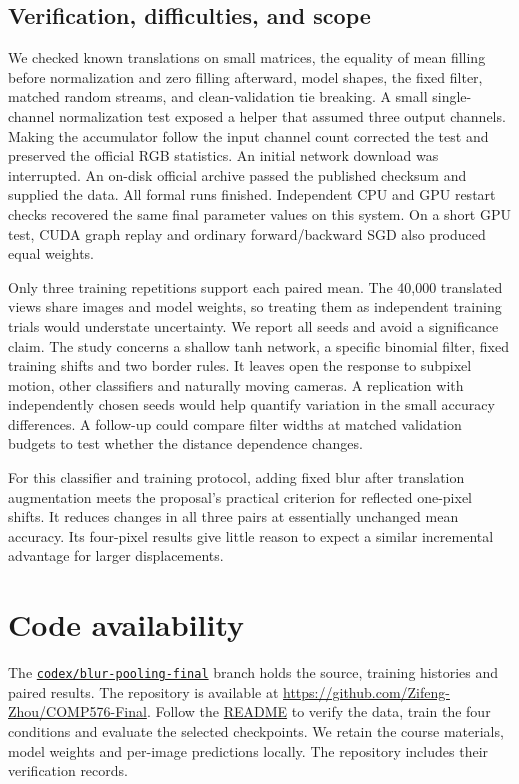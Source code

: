 \documentclass[conference]{IEEEtran}
\begin{document}
\subsection{Verification, difficulties, and scope}
We checked known translations on small matrices, the equality of mean filling before normalization and zero filling afterward, model shapes, the fixed filter, matched random streams, and clean-validation tie breaking. A small single-channel normalization test exposed a helper that assumed three output channels. Making the accumulator follow the input channel count corrected the test and preserved the official RGB statistics. An initial network download was interrupted. An on-disk official archive passed the published checksum and supplied the data. All formal runs finished. Independent CPU and GPU restart checks recovered the same final parameter values on this system. On a short GPU test, CUDA graph replay and ordinary forward/backward SGD also produced equal weights.

Only three training repetitions support each paired mean. The 40,000 translated views share images and model weights, so treating them as independent training trials would understate uncertainty. We report all seeds and avoid a significance claim. The study concerns a shallow tanh network, a specific binomial filter, fixed training shifts and two border rules. It leaves open the response to subpixel motion, other classifiers and naturally moving cameras. A replication with independently chosen seeds would help quantify variation in the small accuracy differences. A follow-up could compare filter widths at matched validation budgets to test whether the distance dependence changes.

For this classifier and training protocol, adding fixed blur after translation augmentation meets the proposal's practical criterion for reflected one-pixel shifts. It reduces changes in all three pairs at essentially unchanged mean accuracy. Its four-pixel results give little reason to expect a similar incremental advantage for larger displacements.

\section*{Code availability}
The \href{https://github.com/Zifeng-Zhou/COMP576-Final/tree/codex/blur-pooling-final}{\texttt{codex/blur-pooling-final}} branch holds the source, training histories and paired results. The repository is available at \url{https://github.com/Zifeng-Zhou/COMP576-Final}. Follow the \href{https://github.com/Zifeng-Zhou/COMP576-Final/blob/codex/blur-pooling-final/README.md}{README} to verify the data, train the four conditions and evaluate the selected checkpoints. We retain the course materials, model weights and per-image predictions locally. The repository includes their verification records.
\end{document}
